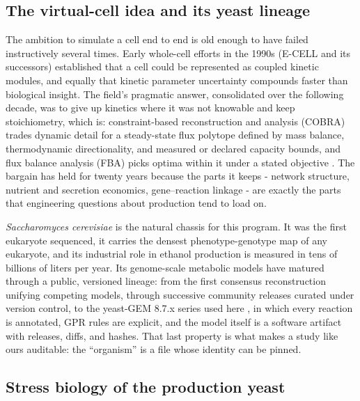 \documentclass[12pt]{article}
\begin{document}
\subsection{The virtual-cell idea and its yeast lineage}

The ambition to simulate a cell end to end is old enough to have
failed instructively several times. Early whole-cell efforts in the
1990s (E-CELL and its successors) established that a cell could be
represented as coupled kinetic modules, and equally that kinetic
parameter uncertainty compounds faster than biological insight. The
field's pragmatic answer, consolidated over the following decade, was
to give up kinetics where it was not knowable and keep stoichiometry,
which is: constraint-based reconstruction and analysis (COBRA)
trades dynamic detail for a steady-state flux polytope defined by
mass balance, thermodynamic directionality, and measured or declared
capacity bounds, and flux balance analysis (FBA) picks optima within
it under a stated objective \cite{fba}. The bargain has held for
twenty years because the parts it keeps - network structure, nutrient
and secretion economics, gene--reaction linkage - are exactly the
parts that engineering questions about production tend to load on.

\emph{Saccharomyces cerevisiae} is the natural chassis for this
program. It was the first eukaryote sequenced, it carries the densest
phenotype-genotype map of any eukaryote, and its industrial role in
ethanol production is measured in tens of billions of liters per year.
Its genome-scale metabolic models have matured through a public,
versioned lineage: from the first consensus reconstruction unifying
competing models, through successive community releases curated under
version control, to the yeast-GEM 8.7.x series used here
\cite{yeastgem}, in which every reaction is annotated, GPR rules are
explicit, and the model itself is a software artifact with releases,
diffs, and hashes. That last property is what makes a study like ours
auditable: the ``organism'' is a file whose identity can be pinned.

\subsection{Stress biology of the production yeast}
\end{document}

